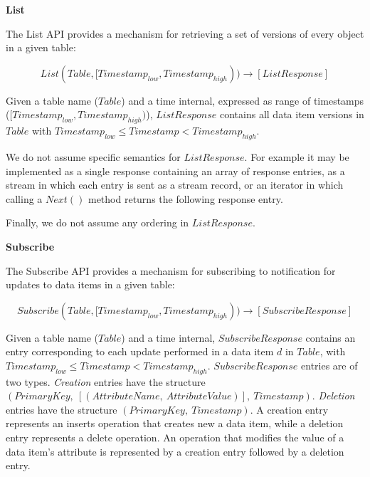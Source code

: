 \bigskip
\noindent
\textbf{List}

\noindent
The List API provides a mechanism for retrieving a set of versions of every object in a given table:

\[
  List(Table, [Timestamp_{low}, Timestamp_{high})) \rightarrow [ListResponse]
\]

\noindent
\begin{sloppypar}
Given a table name ($Table$) and a time internal, expressed as range of timestamps ($[Timestamp_{low}, Timestamp_{high})$),
$ListResponse$ contains all data item versions in $Table$ with $Timestamp_{low} \leq Timestamp < Timestamp_{high}$.
\end{sloppypar}

We do not assume specific semantics for $ListResponse$.
For example it may be implemented as a single response containing an array of response entries,
as a stream in which each entry is sent as a stream record,
or an iterator in which calling a $Next()$ method returns the following response entry.

Finally, we do not assume any ordering in $ListResponse$.



\bigskip
\noindent
\textbf{Subscribe}

\noindent
The Subscribe API provides a mechanism for subscribing to notification for updates to data items in a given table:

\[
  Subscribe(Table, [Timestamp_{low}, Timestamp_{high})) \rightarrow [SubscribeResponse]
\]

\noindent
\begin{sloppypar}
Given a table name ($Table$) and a time internal,
$SubscribeResponse$ contains an entry corresponding to each update performed in a data item $d$ in $Table$, with
$Timestamp_{low} \leq Timestamp < Timestamp_{high}$.
$SubscribeResponse$ entries are of two types.
\textit{Creation} entries have the structure $(PrimaryKey,~[(AttributeName,~AttributeValue)],~Timestamp)$.
\textit{Deletion} entries have the structure $(PrimaryKey,~Timestamp)$.
A creation entry represents an inserts operation that creates new a data item,
while a deletion entry represents a delete operation.
An operation that modifies the value of a data item's attribute is represented by a creation entry followed by a deletion
entry.
\end{sloppypar}

